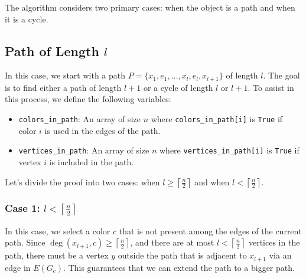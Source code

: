 The algorithm considers two primary cases: when the object is a path and when it is a cycle.

\subsection{Path of Length $l$}

In this case, we start with a path \( P = \{x_1, e_1, \dots, x_{l}, e_{l}, x_{l + 1}\} \) of length \( l \). The goal is to find either a path of length \( l+1 \) or a cycle of length \( l \) or \( l+1 \). To assist in this process, we define the following variables:

\begin{itemize}
    \item \texttt{colors\_in\_path}: An array of size \( n \) where \texttt{colors\_in\_path[i]} is \texttt{True} if color \( i \) is used in the edges of the path.
    \item \texttt{vertices\_in\_path}: An array of size \( n \) where \texttt{vertices\_in\_path[i]} is \texttt{True} if vertex \( i \) is included in the path.
\end{itemize}

Let's divide the proof into two cases: when \( l \geq \left \lceil \frac{n}{2} \right \rceil \) and when \( l < \left \lceil \frac{n}{2} \right \rceil \).

\subsubsection{Case 1: \( l < \left \lceil \frac{n}{2} \right \rceil \)}

In this case, we select a color \( c \) that is not present among 
the edges of the current path. Since 
\( \deg(x_{l + 1}, c) \geq \left \lceil \frac{n}{2} \right \rceil \), 
and there are at most 
\( l < \left \lceil \frac{n}{2} \right \rceil \) 
vertices in the path, there must be a vertex 
\( y \) 
outside the path that is adjacent to 
\( x_{l + 1} \) via an edge in \( E(G_c) \). 
This guarantees that we can extend the path to a bigger path.

